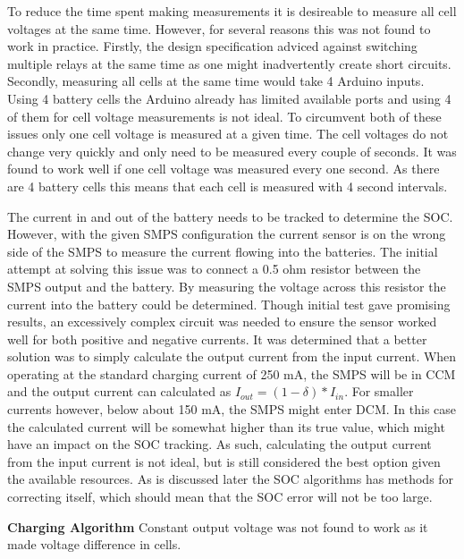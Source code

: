 \documentclass[a4paper]{article}
\begin{document}
To reduce the time spent making measurements it is desireable to measure all cell voltages
at the same time. However, for several reasons this was not found to work in practice. 
Firstly, the design specification adviced against switching multiple relays at the same
time as one might inadvertently create short circuits\cite{energyBrief}. Secondly, measuring
all cells at the same time would take 4 Arduino inputs. Using 4 battery cells the Arduino
already has limited available ports and using 4 of them for cell voltage measurements is not ideal. 
To circumvent both of these issues only one cell voltage is measured at a given time.
The cell voltages do not change very quickly and only need to be measured every couple 
of seconds. It was found to work well if one cell voltage was measured every one second.
As there are 4 battery cells this means that each cell is measured with 4 second intervals.

The current in and out of the battery needs to be tracked to determine the SOC.
However, with the given SMPS configuration the current sensor is on the wrong side of
the SMPS to measure the current flowing into the batteries. The initial attempt at solving
this issue was to connect a 0.5 ohm resistor between the SMPS output and the battery.
By measuring the voltage across this resistor the current into the battery could be
determined. Though initial test gave promising results, an excessively complex circuit
was needed to ensure the sensor worked well for both positive and negative currents.
It was determined that a better solution was to simply calculate the output current
from the input current. When operating at the standard charging current of 250 mA,
the SMPS will be in CCM and the output current can calculated as \( I_{out} = (1 - \delta)*I_{in} \).
For smaller currents however, below about 150 mA, the SMPS might enter DCM. In this case the calculated 
current will be somewhat higher than its true value, which might have an impact on the 
SOC tracking. As such, calculating the output current from the input current is not ideal, 
but is still considered the best option given the available resources. As is discussed 
later the SOC algorithms has methods for correcting itself, which should mean that the
SOC error will not be too large.


\textbf{Charging Algorithm}
\vspace{10pt} 
\newline
Constant output voltage was not found to work as it made voltage difference in cells.
\end{document}
